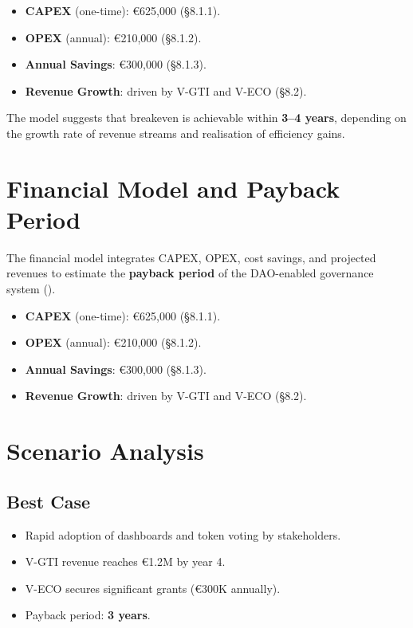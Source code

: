 \documentclass[
  english,
  12pt,
  oneside,
  open=any]{scrbook}
\providecommand{\tightlist}{%
  \setlength{\itemsep}{0pt}\setlength{\parskip}{0pt}}\usepackage{longtable,booktabs,array}
\begin{document}
\begin{itemize}
\tightlist
\item
  \textbf{CAPEX} (one-time): €625,000 (§8.1.1).\\
\item
  \textbf{OPEX} (annual): €210,000 (§8.1.2).\\
\item
  \textbf{Annual Savings}: €300,000 (§8.1.3).\\
\item
  \textbf{Revenue Growth}: driven by V-GTI and V-ECO (§8.2).
\end{itemize}

The model suggests that breakeven is achievable within \textbf{3--4
years}, depending on the growth rate of revenue streams and realisation
of efficiency gains.

\section{Financial Model and Payback Period}\label{sec-payback}

The financial model integrates CAPEX, OPEX, cost savings, and projected
revenues to estimate the \textbf{payback period} of the DAO-enabled
governance system ().

\begin{itemize}
\tightlist
\item
  \textbf{CAPEX} (one-time): €625,000 (§8.1.1).\\
\item
  \textbf{OPEX} (annual): €210,000 (§8.1.2).\\
\item
  \textbf{Annual Savings}: €300,000 (§8.1.3).\\
\item
  \textbf{Revenue Growth}: driven by V-GTI and V-ECO (§8.2).
\end{itemize}

\section{Scenario Analysis}\label{scenario-analysis}

\subsection{Best Case}\label{sec-best}

\begin{itemize}
\tightlist
\item
  Rapid adoption of dashboards and token voting by stakeholders.\\
\item
  V-GTI revenue reaches €1.2M by year 4.\\
\item
  V-ECO secures significant grants (€300K annually).\\
\item
  Payback period: \textbf{3 years}.
\end{itemize}
\end{document}
